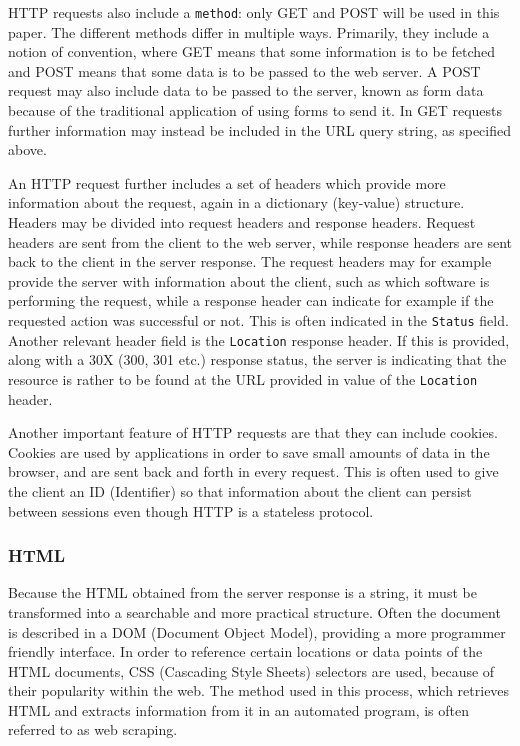 \documentclass{article}
\begin{document}
	HTTP requests also include a \texttt{method}: only GET and POST will be used in this paper. The different methods differ in multiple ways. Primarily, they include a notion of convention, where GET means that some information is to be fetched and POST means that some data is to be passed to the web server. A POST request may also include data to be passed to the server, known as form data because of the traditional application of using forms to send it. In GET requests further information may instead be included in the URL query string, as specified above.
	
	An HTTP request further includes a set of headers which provide more information about the request, again in a dictionary (key-value) structure. Headers may be divided into request headers and response headers. Request headers are sent from the client to the web server, while response headers are sent back to the client in the server response. The request headers may for example provide the server with information about the client, such as which software is performing the request, while a response header can indicate for example if the requested action was successful or not. This is often indicated in the \texttt{Status} field. Another relevant header field is the \texttt{Location} response header. If this is provided, along with a 30X (300, 301 etc.) response status, the server is indicating that the resource is rather to be found at the URL provided in value of the \texttt{Location} header.\cite{wikipedia http request}\cite{wikipedia url}
	
	Another important feature of HTTP requests are that they can include cookies. Cookies are used by applications in order to save small amounts of data in the browser, and are sent back and forth in every request. This is often used to give the client an ID (Identifier) so that information about the client can persist between sessions even though HTTP is a stateless protocol.\cite{wikipedia cookie}
	
	\subsubsection{HTML}
	Because the HTML obtained from the server response is a string, it must be transformed into a searchable and more practical structure. Often the document is described in a DOM (Document Object Model), providing a more programmer friendly interface. In order to reference certain locations or data points of the HTML documents, CSS (Cascading Style Sheets) selectors are used, because of their popularity within the web. The method used in this process, which retrieves HTML and extracts information from it in an automated program, is often referred to as web scraping.\cite{wikipedia css}\cite{wikipedia web scraping}
	
\end{document}
